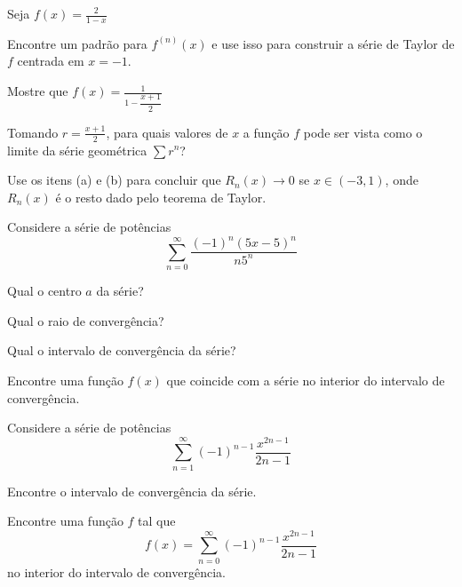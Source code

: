 \begin{exercises*}
\begin{exercise}
  Seja \(f(x)=\frac{2}{1-x}\)
  \begin{alphalist}
    \item Encontre um padrão para $f^{(n)}(x)$ e use isso para construir
      a série de Taylor de $f$ centrada em $x=-1$.
    \item Mostre que
      \(f(x)=\frac{1}{1-\dfrac{x+1}{2}}\)
    \item
      Tomando \(r=\frac{x+1}{2}\), para quais valores de $x$
      a função $f$ pode ser vista como o limite da série geométrica \(\sum r^n\)?
      \item Use os itens (a) e (b) para concluir que $R_n(x)\rightarrow 0$
      se $x\in(-3, 1)$, onde $R_n(x)$ é o resto dado pelo teorema de Taylor.
  \end{alphalist}
\end{exercise}

\begin{exercise}
  Considere a série de potências
  \[\sum_{n=0}^\infty \frac{(-1)^n(5x-5)^{n}}{n5^{n}}\]
  \vspace{-\baselineskip}
  \begin{alphalist}
    \item Qual o centro $a$ da série?
    \item Qual o raio de convergência?
    \item Qual o intervalo de convergência da série?
    \item Encontre uma função $f(x)$ que coincide com a série no interior do intervalo de convergência.
  \end{alphalist}
\end{exercise}

\begin{exercise}
  Considere a série de potências
  \[\sum_{n=1}^\infty (-1)^{n-1}\frac{x^{2n-1}}{2n-1}\]
  \begin{alphalist}
    \item Encontre o intervalo de convergência da série.
    \item Encontre uma função $f$ tal que
      \[ f(x)=\sum_{n=0}^\infty (-1)^{n-1}\frac{x^{2n-1}}{2n-1}\]
    no interior do intervalo de convergência.
  \end{alphalist}
\end{exercise}


\end{exercises*}
